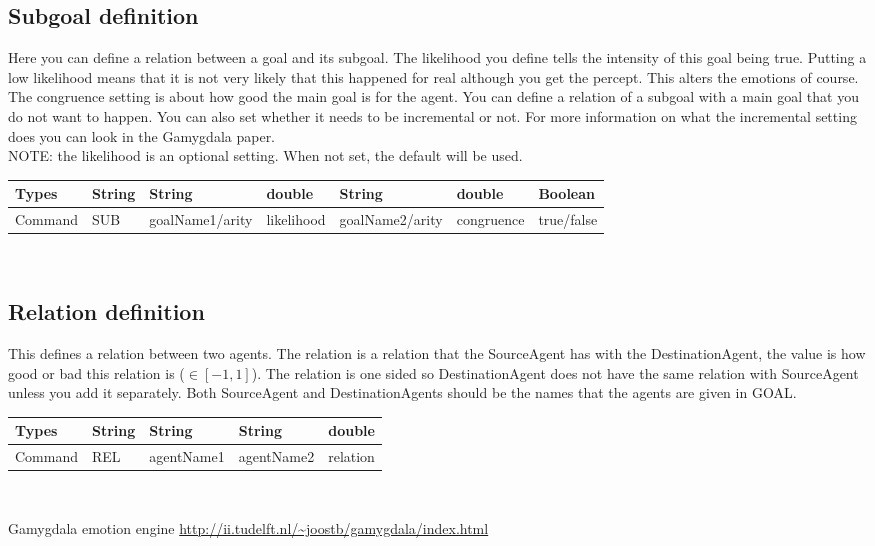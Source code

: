 \documentclass{scrartcl}
\begin{document}
\subsection{Subgoal definition}
Here you can define a relation between a goal and its subgoal. The likelihood you define tells the intensity of this goal being true. Putting a low likelihood means that it is not very likely that this happened for real although you get the percept. This alters the emotions of course. The congruence setting is about how good the main goal is for the agent. You can define a relation of a subgoal with a main goal that you do not want to happen. You can also set whether it needs to be incremental or not. For more information on what the incremental setting does you can look in the Gamygdala paper.\\
NOTE: the likelihood is an optional setting. When not set, the default will be used.
\begin{tabular}{|l|l|l|l|l|l|l|}
	\hline  Types& String & String & double & String & double & Boolean \\ 
	\hline  Command & SUB & goalName1/arity & likelihood & goalName2/arity & congruence & true/false\\ 
	\hline 
\end{tabular} 
\\


\subsection{Relation definition}
This defines a relation between two agents. The relation is a relation that the SourceAgent has with the DestinationAgent, the value is how good or bad this relation is ($\in [-1,1]$). The relation is one sided so DestinationAgent does not have the same relation with SourceAgent unless you add it separately. Both SourceAgent and DestinationAgents should be the names that the agents are given in GOAL.\\
\begin{tabular}{|l|l|l|l|l|}
	\hline  Types& String & String & String & double\\ 
	\hline  Command & REL & agentName1 & agentName2 & relation \\ 
	\hline 
\end{tabular} 
\\
\pagebreak
\begin{thebibliography}{9}	
	Gamygdala emotion engine
	\url{http://ii.tudelft.nl/~joostb/gamygdala/index.html}
\end{thebibliography}

 
\end{document}
